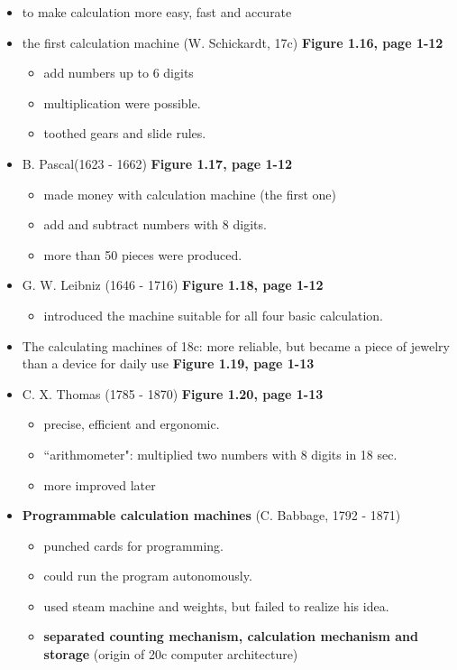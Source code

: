 \documentclass{standalone}
\begin{document}
\begin{itemize}
	\item to make calculation more easy, fast and accurate
	\item the first calculation machine (W. Schickardt, 17c) \textbf{Figure 1.16, page 1-12}
		\begin{itemize}
			\item add numbers up to 6 digits
			\item multiplication were possible. 
			\item toothed gears and slide rules. 
		\end{itemize}
	\item B. Pascal(1623 - 1662) \textbf{Figure 1.17, page 1-12}
		\begin{itemize}
			\item made money with calculation machine (the first one) 
			\item add and subtract numbers with 8 digits. 
			\item more than 50 pieces were produced. 
		\end{itemize}
	\item G. W. Leibniz (1646 - 1716) \textbf{Figure 1.18, page 1-12}
		\begin{itemize}
			\item introduced the machine suitable for all four basic calculation. 
		\end{itemize} 
	\item The calculating machines of 18c: more reliable, but became a piece of jewelry than a device for daily use \textbf{Figure 1.19, page 1-13}
	\item C. X. Thomas (1785 - 1870) \textbf{Figure 1.20, page 1-13}
		\begin{itemize}
			\item precise, efficient and ergonomic.
			\item ``arithmometer": multiplied two numbers with 8 digits in 18 sec.
			\item more improved later 	
		\end{itemize}
	\item \textbf{Programmable calculation machines} (C. Babbage, 1792 - 1871)
		\begin{itemize}
			\item punched cards for programming. 
			\item could run the program autonomously.
			\item used steam machine and weights, but failed to realize his idea. 
			\item \textbf{separated counting mechanism, calculation mechanism and storage} (origin of 20c computer architecture)

\end{itemize}
\end{itemize}
\end{document}
